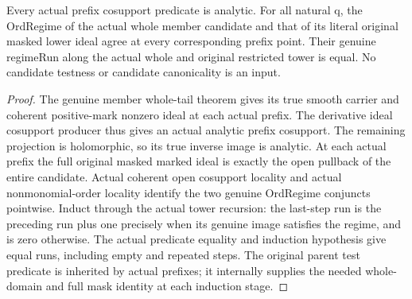 \begin{lemma}
\label{hir:member-companion-actual-run-restriction}
\leanok
Every actual prefix cosupport predicate is analytic. For all natural q, the
OrdRegime of the actual whole member candidate and that of its literal original
masked lower ideal agree at every corresponding prefix point. Their genuine
regimeRun along the actual whole and original restricted tower is equal.
No candidate testness or candidate canonicality is an input.
\end{lemma}
\begin{proof}
The genuine member whole-tail theorem gives its true smooth carrier and
coherent positive-mark nonzero ideal at each actual prefix. The derivative
ideal cosupport producer thus gives an actual analytic prefix cosupport.
The remaining projection is holomorphic, so its true inverse image is analytic.
At each actual prefix the full original masked marked ideal is exactly the
open pullback of the entire candidate. Actual coherent open cosupport locality
and actual nonmonomial-order locality identify the two genuine OrdRegime
conjuncts pointwise. Induct through the actual tower recursion: the last-step
run is the preceding run plus one precisely when its genuine image satisfies
the regime, and is zero otherwise. The actual predicate equality and induction
hypothesis give equal runs, including empty and repeated steps. The original
parent test predicate is inherited by actual prefixes; it internally supplies
the needed whole-domain and full mask identity at each induction stage.
\end{proof}

